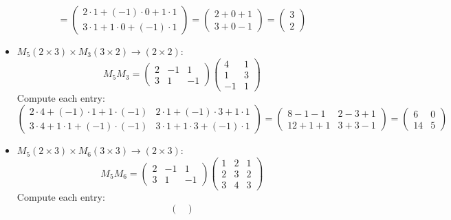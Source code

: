 \documentclass{article}
\begin{document}
\begin{itemize}
\[    = \begin{pmatrix}
        2 \cdot 1 + (-1) \cdot 0 + 1 \cdot 1 \\
        3 \cdot 1 + 1 \cdot 0 + (-1) \cdot 1
    \end{pmatrix}
    = \begin{pmatrix}
        2 + 0 + 1 \\
        3 + 0 - 1
    \end{pmatrix}
    = \begin{pmatrix}
        3 \\
        2
    \end{pmatrix}
    \]
    \item \( M_5 (2 \times 3) \times M_3 (3 \times 2) \to (2 \times 2) \):
    \[
    M_5 M_3 = \begin{pmatrix} 2 & -1 & 1 \\ 3 & 1 & -1 \end{pmatrix} \begin{pmatrix} 4 & 1 \\ 1 & 3 \\ -1 & 1 \end{pmatrix}
    \]
    Compute each entry:
    \[
    \begin{pmatrix}
        2 \cdot 4 + (-1) \cdot 1 + 1 \cdot (-1) & 2 \cdot 1 + (-1) \cdot 3 + 1 \cdot 1 \\
        3 \cdot 4 + 1 \cdot 1 + (-1) \cdot (-1) & 3 \cdot 1 + 1 \cdot 3 + (-1) \cdot 1
    \end{pmatrix}
    = \begin{pmatrix}
        8 - 1 - 1 & 2 - 3 + 1 \\
        12 + 1 + 1 & 3 + 3 - 1
    \end{pmatrix}
    = \begin{pmatrix}
        6 & 0 \\
        14 & 5
    \end{pmatrix}
    \]
    \item \( M_5 (2 \times 3) \times M_6 (3 \times 3) \to (2 \times 3) \):
    \[
    M_5 M_6 = \begin{pmatrix} 2 & -1 & 1 \\ 3 & 1 & -1 \end{pmatrix}
    \begin{pmatrix}
        1 & 2 & 1 \\
        2 & 3 & 2 \\
        3 & 4 & 3
    \end{pmatrix}
    \]
    Compute each entry:
    \[
    \begin{pmatrix}

\end{pmatrix}\]
\end{itemize}
\end{document}
